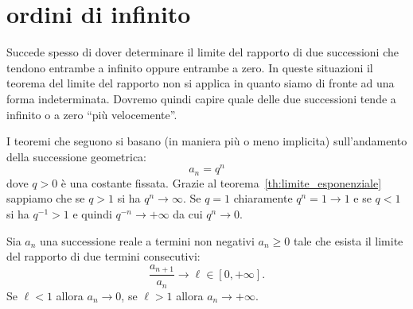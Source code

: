\section{ordini di infinito}

Succede spesso di dover determinare il limite
del rapporto di due successioni che tendono entrambe a infinito
oppure entrambe a zero.
In queste situazioni il teorema del limite del rapporto non
si applica in quanto siamo di fronte ad una forma indeterminata.
Dovremo quindi capire quale delle due successioni
tende a infinito o a zero ``più velocemente''.

I teoremi che seguono si basano (in maniera più o meno implicita)
sull'andamento della successione geometrica:
\[
  a_n = q^n
\]
dove $q>0$ è una costante fissata.
Grazie al teorema~\ref{th:limite_esponenziale}
sappiamo che se $q>1$ si ha $q^n\to \infty$.
Se $q=1$ chiaramente $q^n=1\to 1$
e se $q<1$ si ha $q^{-1}>1$ e quindi $q^{-n} \to +\infty$
da cui $q^n \to 0$.

\begin{theorem}
\label{th:criterio_rapporto}
  Sia $a_n$ una successione reale a termini non negativi
  $a_n \ge 0$ tale che esista il limite del rapporto di due termini consecutivi:
  \[
     \frac{a_{n+1}}{a_n} \to \ell \in [0,+\infty].
  \]
  Se $\ell < 1$ allora $a_n \to 0$, se $\ell >1$ allora $a_n \to +\infty$.
\end{theorem}
%
\begin{comment}
\begin{proof}\footnote{%
  la dimostrazione di questo teorema si potrebbe fare in maniera
  molto simile alla dimostrazione del teorema~\ref{th:criterio_radice}
  senza tirare in ballo il teorema~\ref{th:criterio_cesaro} che è decisamente più complesso.
  }
Grazie al teorema~\ref{th:criterio_cesaro} sappiamo
che $\sqrt[n]{a_n}\to \ell$ e quindi il risultato
segue direttametne dal teorema~\ref{th:criterio_radice}.
\end{proof}
\end{comment}

